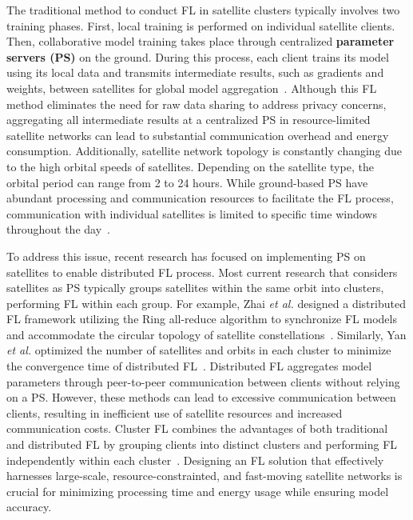 
The traditional method to conduct FL in satellite clusters typically involves two training phases. First, local training is performed on individual satellite clients. Then, collaborative model training takes place through centralized \textbf{parameter servers (PS)} on the ground. During this process, each client trains its model using its local data and transmits intermediate results, such as gradients and weights, between satellites for global model aggregation~\cite{ChenPIMRC23}. Although this FL method eliminates the need for raw data sharing to address privacy concerns, aggregating all intermediate results at a centralized PS in resource-limited satellite networks can lead to substantial communication overhead and energy consumption. Additionally, satellite network topology is constantly changing due to the high orbital speeds of satellites. Depending on the satellite type, the orbital period can range from 2 to 24 hours. While ground-based PS have abundant processing and communication resources to facilitate the FL process, communication with individual satellites is limited to specific time windows throughout the day~\cite{MathIN24}.

To address this issue, recent research has focused on implementing PS on satellites to enable distributed FL process. Most current research that considers satellites as PS typically groups satellites within the same orbit into clusters, performing FL within each group. For example, Zhai \textit{et al.} designed a distributed FL framework utilizing the Ring all-reduce algorithm to synchronize FL models and accommodate the circular topology of satellite constellations~\cite{ZhaiTMC24}. Similarly, Yan \textit{et al.} optimized the number of satellites and orbits in each cluster to minimize the convergence time of distributed FL~\cite{YanTVT24}. Distributed FL aggregates model parameters through peer-to-peer communication between clients without relying on a PS. However, these methods can lead to excessive communication between clients, resulting in inefficient use of satellite resources and increased communication costs. Cluster FL combines the advantages of both traditional and distributed FL by grouping clients into distinct clusters and performing FL independently within each cluster~\cite{LiuICC20,FedCE23}. Designing an FL solution that effectively harnesses large-scale, resource-constrainted, and fast-moving satellite networks is crucial for minimizing processing time and energy usage while ensuring model accuracy.



